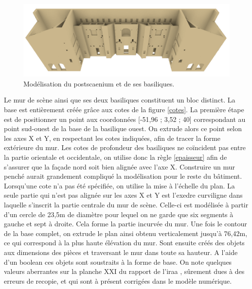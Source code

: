 \begin{figure}[!h]
	\includegraphics[width=\linewidth]{images/modMur2}
	\caption{Modélisation du \gls{postscaenium} et de ses \glspl{basilique}.} 
	\label{modCavea} 
\end{figure} 

Le mur de scène ainsi que ses deux basiliques constituent un bloc distinct. La base est entièrement créée grâce aux cotes de la figure \ref{cotes}. La première étape est de positionner un point aux coordonnées [-51,96 ; 3,52 ; 40] correspondant au point sud-ouest de la base de la basilique ouest. On extrude alors ce point selon les axes X et Y, en respectant les cotes indiquées, afin de tracer la forme extérieure du mur. Les cotes de profondeur des basiliques ne coïncident pas entre la partie orientale et occidentale, on utilise donc la règle \ref{epaisseur} afin de s'assurer que la façade nord soit bien alignée avec l'axe X. Construire un mur penché aurait grandement compliqué la modélisation pour le reste du bâtiment. Lorsqu'une cote n'a pas été spécifiée, on utilise la mise à l'échelle du plan. La seule partie qui n'est pas alignée sur les axes X et Y est l'\gls{exedre} curviligne dans laquelle s'inscrit la partie centrale du mur de scène. Celle-ci est modélisée à partir d'un cercle de 23,5m de diamètre pour lequel on ne garde que six segments à gauche et sept à droite. Cela forme la partie incurvée du mur. Une fois le contour de la base complet, on extrude le plan ainsi obtenu verticalement jusqu'à 76,42m, ce qui correspond à la plus haute élévation du mur. Sont ensuite créés des objets aux dimensions des pièces et traversant le mur dans toute sa hauteur. A l'aide d'un \gls{boolean} ces objets sont soustraits à la forme de base. On note quelques valeurs aberrantes sur la planche XXI du rapport de l'\gls{iraa} \cite[Pl. XXI]{orangePl}, sûrement dues à des erreurs de recopie, et qui sont à présent corrigées dans le modèle numérique. 

